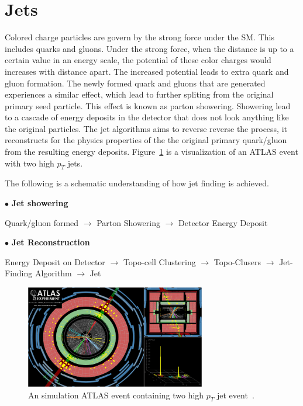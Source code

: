 \section{Jets}
\label{sec:Jet}
Colored charge particles are govern by the strong force under the SM. This includes quarks and gluons. Under the strong force, when the distance is up to a certain value in an energy scale, the potential of these color charges would increases with distance apart. The increased potential leads to extra quark and gluon formation. The newly formed quark and gluons that are generated experiences a similar effect, which lead to further spliting from the original primary seed particle. This effect is known as parton showering. 
Showering lead to a cascade of energy deposits in the detector that does not look anything like the original particles. The jet algorithms aims to reverse reverse the process, it reconstructs for the physics properties of the the original primary quark/gluon from the resulting energy deposits. Figure~\ref{fig:jetEvent} is a visualization of an ATLAS event with two high $p_{T}$ jets.

The following is a schematic understanding of how jet finding is achieved. 

$\bullet$ \textbf{Jet showering}

Quark/gluon formed $\rightarrow$  Parton Showering $\rightarrow$ Detector Energy Deposit

$\bullet$ \textbf{Jet Reconstruction}

Energy Deposit on Detector  $\rightarrow$  Topo-cell Clustering $\rightarrow$  Topo-Clusers $\rightarrow$  Jet-Finding Algorithm $\rightarrow$ Jet


\begin{figure}[!htb]
    \begin{center}
        \includegraphics[width=0.7\textwidth]{figures/common_ana/JetEvent}
        \caption{        
            An simulation ATLAS event containing two high $p_{T}$ jet event~\cite{jetEvent}.
        }
        \label{fig:jetEvent}
    \end{center}
\end{figure}

